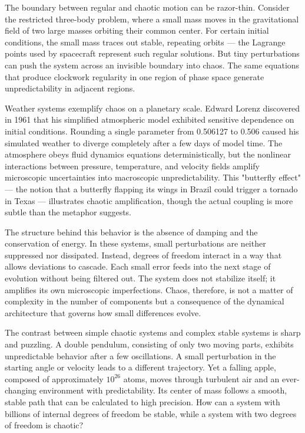 The boundary between regular and chaotic motion can be razor-thin. Consider the restricted three-body problem, where a small mass moves in the gravitational field of two large masses orbiting their common center. For certain initial conditions, the small mass traces out stable, repeating orbits — the Lagrange points used by spacecraft represent such regular solutions. But tiny perturbations can push the system across an invisible boundary into chaos. The same equations that produce clockwork regularity in one region of phase space generate unpredictability in adjacent regions.

Weather systems exemplify chaos on a planetary scale. Edward Lorenz discovered in 1961 that his simplified atmospheric model exhibited sensitive dependence on initial conditions. Rounding a single parameter from 0.506127 to 0.506 caused his simulated weather to diverge completely after a few days of model time. The atmosphere obeys fluid dynamics equations deterministically, but the nonlinear interactions between pressure, temperature, and velocity fields amplify microscopic uncertainties into macroscopic unpredictability. This "butterfly effect" — the notion that a butterfly flapping its wings in Brazil could trigger a tornado in Texas — illustrates chaotic amplification, though the actual coupling is more subtle than the metaphor suggests.

The structure behind this behavior is the absence of damping and the conservation of energy. In these systems, small perturbations are neither suppressed nor dissipated. Instead, degrees of freedom interact in a way that allows deviations to cascade. Each small error feeds into the next stage of evolution without being filtered out. The system does not stabilize itself; it amplifies its own microscopic imperfections. Chaos, therefore, is not a matter of complexity in the number of components but a consequence of the dynamical architecture that governs how small differences evolve.


The contrast between simple chaotic systems and complex stable systems is sharp and puzzling. A double pendulum, consisting of only two moving parts, exhibits unpredictable behavior after a few oscillations. A small perturbation in the starting angle or velocity leads to a different trajectory. Yet a falling apple, composed of approximately $10^{26}$ atoms, moves through turbulent air and an ever-changing environment with predictability. Its center of mass follows a smooth, stable path that can be calculated to high precision. How can a system with billions of internal degrees of freedom be stable, while a system with two degrees of freedom is chaotic?

